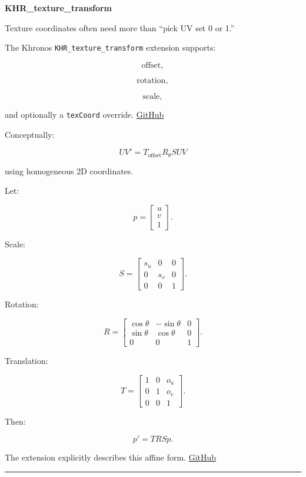 \textbf{KHR\_texture\_transform}

Texture coordinates often need more than ``pick UV set 0 or 1.''

The Khronos \texttt{KHR\_texture\_transform} extension supports:

\[
\text{offset},
\]

\[
\text{rotation},
\]

\[
\text{scale},
\]

and optionally a \texttt{texCoord} override. \href{https://github.com/KhronosGroup/glTF/blob/main/extensions/2.0/Khronos/KHR_texture_transform/README.md?utm_source=chatgpt.com}{GitHub}

Conceptually:

\[
\boxed{
UV'
=
T_{\text{offset}}
R_{\theta}
S
UV
}
\]

using homogeneous 2D coordinates.

Let:

\[
p=
\begin{bmatrix}
u\\v\\1
\end{bmatrix}.
\]

Scale:

\[
S=
\begin{bmatrix}
s_u&0&0\\
0&s_v&0\\
0&0&1
\end{bmatrix}.
\]

Rotation:

\[
R=
\begin{bmatrix}
\cos\theta&-\sin\theta&0\\
\sin\theta&\cos\theta&0\\
0&0&1
\end{bmatrix}.
\]

Translation:

\[
T=
\begin{bmatrix}
1&0&o_u\\
0&1&o_v\\
0&0&1
\end{bmatrix}.
\]

Then:

\[
\boxed{
p'=TRSp.
}
\]

The extension explicitly describes this affine form. \href{https://github.com/KhronosGroup/glTF/blob/main/extensions/2.0/Khronos/KHR_texture_transform/README.md?utm_source=chatgpt.com}{GitHub}

\begin{center}\rule{0.5\linewidth}{0.5pt}\end{center}

